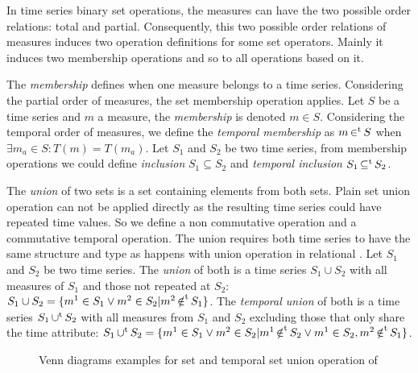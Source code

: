 In time series binary set operations, the measures can have the
two possible order relations: total and partial. Consequently, this two
possible order relations of measures induces two operation definitions
for some set operators.  Mainly it induces two membership operations
and so to all operations based on it. 


The \emph{membership} defines when one measure belongs to a time
series. Considering the partial order of measures, the set
membership operation applies. Let $S$ be a time series and $m$ a
measure, the \emph{membership} is denoted $m \in S$. Considering the
temporal order of measures, we define the \emph{temporal membership}
as $m \operatorname*{\in^t} S$ when $\exists m_a \in S : T(m) = T(m_a)$.  Let $S_1$
and $S_2$ be two time series, from membership operations we could
define \emph{inclusion} $S_1\subseteq S_2$ and \emph{temporal
  inclusion} $S_1\operatorname*{\subseteq^t} S_2$.


The \emph{union} of two sets is a set containing elements from both
sets. Plain set union operation can not be applied directly as the
resulting time series could have repeated time values.  So we define a
non commutative operation and a commutative temporal operation. The
union requires both time series to have the same structure and type as
happens with union operation in relational 
\cite{date:introduction}. %
Let $S_1$ and $S_2$ be two time series. The \emph{union} of both is a
time series $S_1 \cup S_2$ with all measures of $S_1$ and those not
repeated at $S_2$: $S_1 \cup S_2 = \{m^1 \in S_1 \vee m^2 \in S_2 |
m^2 \operatorname*{\notin^t} S_1 \}$. The \emph{temporal union} of both is a time
series $S_1 \operatorname*{\cup^t} S_2$ with all measures from $S_1$ and $S_2$
excluding those that only share the time attribute: $S_1 \operatorname*{\cup^t} S_2 =
\{ m^1 \in S_1 \vee m^2 \in S_2 | m^1 \operatorname*{\notin^t} S_2 \vee m^1 \in S_2,
m^2 \operatorname*{\notin^t} S_1 \}$.

\begin{figure}
  \centering
  
  \caption{Venn diagrams examples for set and temporal set union
    operation of }
  \label{fig:model:venn}
\end{figure}


